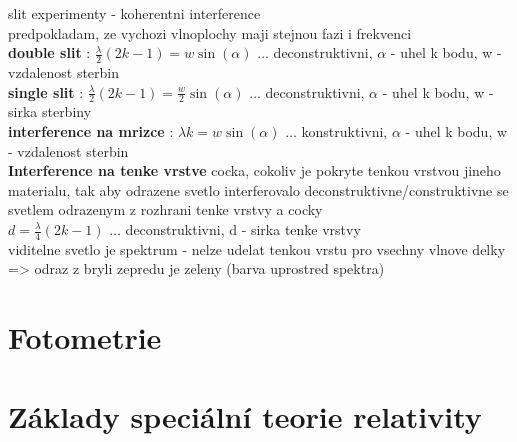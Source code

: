 \documentclass{report}
\begin{document}
slit experimenty - koherentni interference \\
predpokladam, ze vychozi vlnoplochy maji stejnou fazi i frekvenci \\

\textbf{double slit} : $\frac{\lambda}{2}(2k-1)=w\sin(\alpha)$ $\ldots$ deconstruktivni, $\alpha$ - uhel k bodu, w - vzdalenost sterbin\\
\textbf{single slit} : $\frac{\lambda}{2}(2k-1)=\frac{w}{2}\sin(\alpha)$ $\ldots$ deconstruktivni, $\alpha$ - uhel k bodu, w - sirka sterbiny\\
\textbf{interference na mrizce} : $\lambda k=w\sin(\alpha)$ $\ldots$ konstruktivni, $\alpha$ - uhel k bodu, w - vzdalenost sterbin\\

\textbf{Interference na tenke vrstve}
cocka, cokoliv je pokryte tenkou vrstvou jineho materialu, tak aby odrazene svetlo interferovalo deconstruktivne/construktivne se svetlem odrazenym z rozhrani tenke vrstvy a cocky \\

$d=\frac{\lambda}{4}(2k-1)$ $\ldots$ deconstruktivni, d - sirka tenke vrstvy \\
viditelne svetlo je spektrum - nelze udelat tenkou vrstu pro vsechny vlnove delky => odraz z bryli zepredu je zeleny (barva uprostred spektra) \\
\newpage

\section{Fotometrie}
\newpage


\section{Základy speciální teorie relativity}
\end{document}
